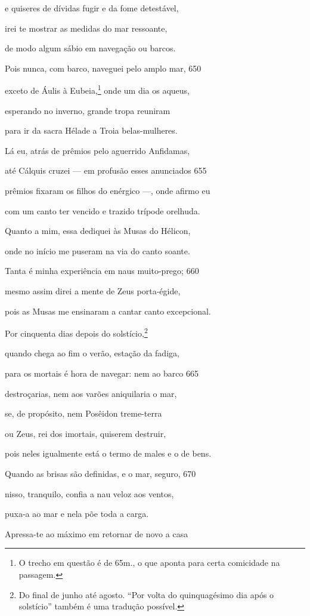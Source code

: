 e quiseres de dívidas fugir e da fome detestável,

irei te mostrar as medidas do mar ressoante,

de modo algum sábio em navegação ou barcos.

Pois nunca, com barco, naveguei pelo amplo mar, \num{650}

exceto de Áulis à Eubeia,\footnote{O trecho em questão é de 65m., o que aponta para certa comicidade na passagem.} onde um dia os aqueus,

esperando no inverno, grande tropa reuniram

para ir da sacra Hélade a Troia belas-mulheres.

Lá eu, atrás de prêmios pelo aguerrido Anfidamas,

até Cálquis cruzei --- em profusão esses anunciados \num{655}

prêmios fixaram os filhos do enérgico ---, onde afirmo eu

com um canto ter vencido e trazido trípode orelhuda.

Quanto a mim, essa dediquei às Musas do Hélicon,

onde no início me puseram na via do canto soante.

Tanta é minha experiência em naus muito-prego; \num{660}

mesmo assim direi a mente de Zeus porta-égide,

pois as Musas me ensinaram a cantar canto excepcional.

Por cinquenta dias depois do solstício,\footnote{Do final de junho até agosto. ``Por volta do quinquagésimo dia após o solstício'' também é uma tradução possível.}

quando chega ao fim o verão, estação da fadiga,

para os mortais é hora de navegar: nem ao barco \num{665}

destroçarias, nem aos varões aniquilaria o mar,

se, de propósito, nem Posêidon treme-terra

ou Zeus, rei dos imortais, quiserem destruir,

pois neles igualmente está o termo de males e o de bens.

Quando as brisas são definidas, e o mar, seguro, \num{670}

nisso, tranquilo, confia a nau veloz aos ventos,

puxa-a ao mar e nela põe toda a carga.

Apressa-te ao máximo em retornar de novo a casa

